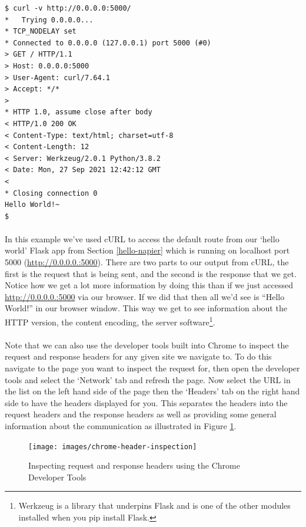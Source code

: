 \documentclass[12pt, a4paper, oneside]{book}
\begin{document}
{\begin{lstlisting}[style=DOS]
$ curl -v http://0.0.0.0:5000/
*   Trying 0.0.0.0...
* TCP_NODELAY set
* Connected to 0.0.0.0 (127.0.0.1) port 5000 (#0)
> GET / HTTP/1.1
> Host: 0.0.0.0:5000
> User-Agent: curl/7.64.1
> Accept: */*
> 
* HTTP 1.0, assume close after body
< HTTP/1.0 200 OK
< Content-Type: text/html; charset=utf-8
< Content-Length: 12
< Server: Werkzeug/2.0.1 Python/3.8.2
< Date: Mon, 27 Sep 2021 12:42:12 GMT
< 
* Closing connection 0
Hello World!~
$ 
\end{lstlisting}

\paragraph{} In this example we've used cURL to access the default route from our `hello world' Flask app from Section \ref{hello-napier} which is running on localhost port 5000 (\url{http://0.0.0.0.:5000}). There are two parts to our output from cURL, the first is the request that is being sent, and the second is the response that we get. Notice how we get a lot more information by doing this than if we just accessed \url{http://0.0.0.0.:5000} via our browser. If we did that then all we'd see is ``Hello World!'' in our browser window. This way we get to see information about the HTTP version, the content encoding, the server software\footnote{Werkzeug is a library that underpins Flask and is one of the other modules installed when you pip install Flask.}.

\paragraph{} Note that we can also use the developer tools built into Chrome to inspect the request and response headers for any given site we navigate to. To do this navigate to the page you want to inspect the request for, then open the developer tools and select the `Network' tab and refresh the page. Now select the URL in the list on the left hand side of the page then the `Headers' tab on the right hand side to have the headers displayed for you. This separates the headers into the request headers and the response headers as well as providing some general information about the communication as illustrated in Figure \ref{fig:chrome-header-inspection}.

\begin{figure}[H]
\centering
\texttt{[image: images/chrome-header-inspection]}
\caption{Inspecting request and response headers using the Chrome Developer Tools}
\label{fig:chrome-header-inspection}
\end{figure}




}
\end{document}
